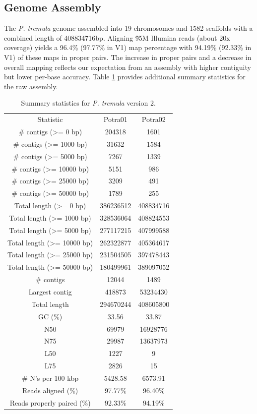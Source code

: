 \documentclass{article}
\begin{document}
\subsection{Genome Assembly}
The {\it P. tremula} genome assembled into 19 chromosomes and 1582 scaffolds with a combined length of 408834716bp. Aligning \~95M Illumina reads (about 20x coverage) yields a 96.4\% (97.77\% in V1) map percentage with 94.19\% (92.33\% in V1) of these maps in proper pairs. The increase in proper pairs and a decrease in overall mapping reflects our expectation from an assembly with higher contiguity but lower per-base accuracy. Table \ref{T1} provides additional summary statistics for the raw assembly.\\ 
\begin{table}
\caption{Summary statistics for {\it P. tremula} version 2.}
\label{T1}
\begin{center}
\begin{tabular}{|c|c|c|}
\hline
Statistic & Potra01 & Potra02 \\
\# contigs (>= 0 bp) & 204318 & 1601 \\
\# contigs (>= 1000 bp) & 31632 & 1584 \\
\# contigs (>= 5000 bp) & 7267 & 1339 \\
\# contigs (>= 10000 bp) & 5151 & 986 \\
\# contigs (>= 25000 bp) & 3209 & 491 \\
\# contigs (>= 50000 bp) & 1789 & 255 \\
Total length (>= 0 bp) & 386236512 & 408834716 \\
Total length (>= 1000 bp) & 328536064 & 408824553 \\
Total length (>= 5000 bp) & 277117215 & 407999588 \\
Total length (>= 10000 bp) & 262322877 & 405364617 \\
Total length (>= 25000 bp) & 231504505 & 397478443 \\
Total length (>= 50000 bp) & 180499961 & 389097052 \\
\# contigs & 12044 & 1489 \\
Largest contig & 418873 & 53234430 \\
Total length & 294670244 & 408605800 \\
GC (\%) & 33.56 & 33.87 \\
N50 & 69979 & 16928776 \\
N75 & 29987 & 13637973 \\
L50 & 1227 & 9 \\
L75 & 2826 & 15 \\
\# N's per 100 kbp & 5428.58 & 6573.91 \\
Reads aligned (\%) & 97.77\% & 96.40\% \\
Reads properly paired (\%) & 92.33\% & 94.19\% \\
\hline
\end{tabular}
\end{center}
\end{table}\\
\end{document}
